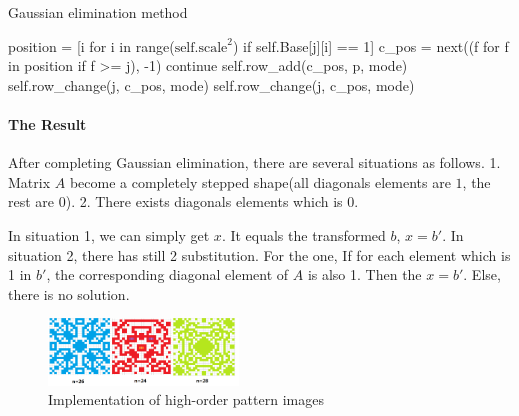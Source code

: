 \documentclass[
  manuscript=article,  %
  layout=preprint,  %
  year=20xx,
  volume=x,
]{extra/joas}
\begin{document}
\begin{algorithm}
\caption{Gaussian elimination method}
\begin{algorithmic}
    \State position = [i for i in range($\text{self.scale}^2$) if self.Base[j][i] == 1]
    \State c\_pos = next((f for f in position if f >= j), -1)
        \State continue
    \EndIf
                \State self.row\_add(c\_pos, p, mode)
            \EndIf
        \EndFor
            \State self.row\_change(j, c\_pos, mode)
        \EndIf
        \State self.row\_change(j, c\_pos, mode)
    \EndIf
\EndFor
\end{algorithmic}
\end{algorithm}

\paragraph{The Result} After completing Gaussian elimination, there are several situations as follows. 
1. Matrix $A$ become a completely stepped shape(all diagonals elements are $1$, the rest are $0$). 
2. There exists diagonals elements which is $0$. 

In situation 1, we can simply get $x$. It equals the transformed $b$, $x = b'$. 
In situation 2, there has still 2 substitution. For the one, If for each element which is 1 in $b'$, 
the corresponding diagonal element of $A$ is also 1. Then the $x = b'$. Else, there is no solution.


\begin{figure}[ht!]
  \centering
  \includegraphics[width=0.45\textwidth]{./flip game/3.png}
  \caption{Implementation of high-order pattern images}
\end{figure}

% 
\end{document}
